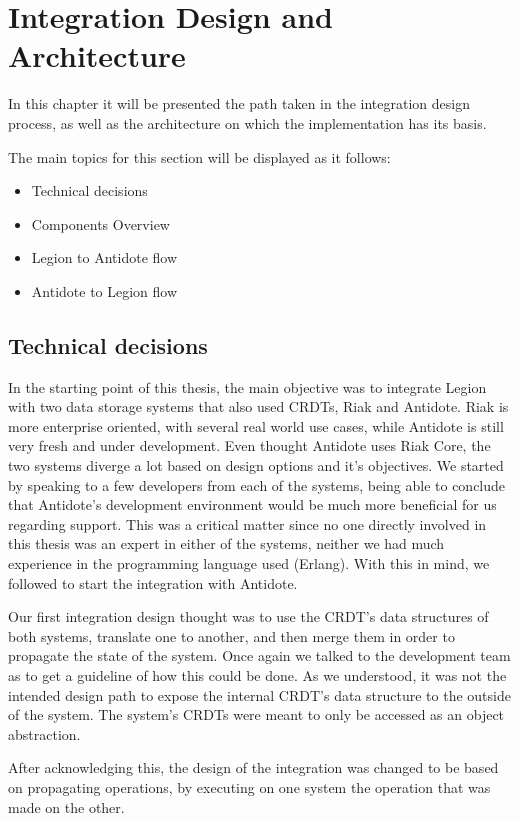 \chapter{Integration Design and Architecture}
\label{cha:integration_design_and_architecture}

In this chapter it will be presented the path taken in the integration design process, as well as the architecture on which the implementation has its basis.\par
	The main topics for this section will be displayed as it follows:
\begin{itemize}
\item Technical decisions

\item Components Overview

\item Legion to Antidote flow

\item Antidote to Legion flow
\end{itemize}

\section{Technical decisions}
\label{sec:technical_decisions}
In the starting point of this thesis, the main objective was to integrate Legion with two data storage systems that also used CRDTs, Riak and Antidote. Riak is more enterprise oriented, with several real world use cases, while Antidote is still very fresh and under development. Even thought Antidote uses Riak Core, the two systems diverge a lot based on design options and it's objectives. We started by speaking to a few developers from each of the systems, being able to conclude that Antidote's development environment would be much more beneficial for us regarding support. This was a critical matter since no one directly involved in this thesis was an expert in either of the systems, neither we had much experience in the programming language used (Erlang). With this in mind, we followed to start the integration with Antidote.\par
Our first integration design thought was to use the CRDT's data structures of both systems, translate one to another, and then merge them in order to propagate the state of the system. Once again we talked to the development team as to get a guideline of how this could be done. As we understood, it was not the intended design path to expose the internal CRDT's data structure to the outside of the system. The system's CRDTs were meant to only be accessed as an object abstraction.\par
After acknowledging this, the design of the integration was changed to be based on propagating operations, by executing on one system the operation that was made on the other.


